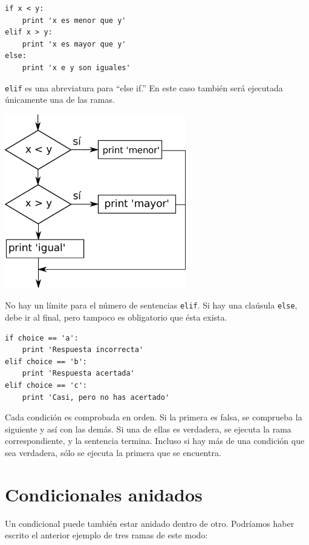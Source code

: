 \beforeverb
\begin{verbatim}
if x < y:
    print 'x es menor que y'
elif x > y:
    print 'x es mayor que y'
else:
    print 'x e y son iguales'
\end{verbatim}
\afterverb
%
{\tt elif} es una abreviatura para ``else if.''  En este caso también
será ejecutada únicamente una de las ramas.

\beforefig
\centerline{\includegraphics[height=3.00in]{figs2/elif.eps}}
\afterfig

No hay un límite para el número de sentencias
{\tt elif}. Si hay una claúsula {\tt else}, debe ir
al final, pero tampoco es obligatorio que ésta exista.



\beforeverb
\begin{verbatim}
if choice == 'a':
    print 'Respuesta incorrecta'
elif choice == 'b':
    print 'Respuesta acertada'
elif choice == 'c':
    print 'Casi, pero no has acertado'
\end{verbatim}
\afterverb
%
Cada condición es comprobada en orden. Si la primera es falsa,
se comprueba la siguiente y así con las demás. Si una de ellas es
verdadera, se ejecuta la rama correspondiente, y la sentencia
termina. Incluso si hay más de una condición que sea verdadera, sólo se
ejecuta la primera que se encuentra.

\section{Condicionales anidados}

Un condicional puede también estar anidado dentro de otro. Podríamos
haber escrito el anterior ejemplo de tres ramas de este modo:

